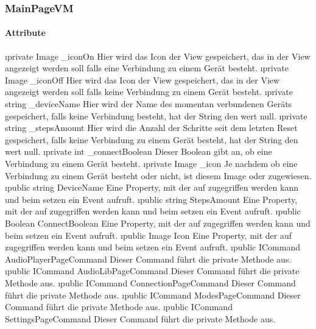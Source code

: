 \documentclass[../entwurf.tex]{subfiles}
\begin{document}
\subsubsection{MainPageVM}
\paragraph{Attribute}
\begin{itemize}
	\i{private Image \_iconOn} Hier wird das Icon der View gespeichert, das in der View angezeigt werden soll falls eine Verbindung zu einem Gerät besteht.
	\i{private Image \_iconOff} Hier wird das Icon der View gespeichert, das in der View angezeigt werden soll falls keine Verbindung zu einem Gerät besteht.
	\i{private string \_deviceName} Hier wird der Name des momentan verbundenen Geräts gespeichert, falls keine Verbindung besteht, hat der String den wert null.
	\i{private string \_stepsAmount} Hier wird die Anzahl der Schritte seit dem letzten Reset gespeichert, falls keine Verbindung zu einem Gerät besteht, hat der String den wert null.
	\i{private int \_connectBoolean} Dieser Boolean gibt an, ob eine Verbindung zu einem Gerät besteht.
	\i{private Image \_icon} Je nachdem ob eine Verbindung zu einem Gerät besteht oder nicht, ist diesem Image  oder  zugewiesen.
	\i{public string DeviceName} Eine Property, mit der auf  zugegriffen werden kann und beim setzen ein Event aufruft.
	\i{public string StepsAmount} Eine Property, mit der auf  zugegriffen werden kann und beim setzen ein Event aufruft.
	\i{public Boolean ConnectBoolean} Eine Property, mit der auf  zugegriffen werden kann und beim setzen ein Event aufruft.
	\i{public Image Icon} Eine Property, mit der auf  zugegriffen werden kann und beim setzen ein Event aufruft.
	\i{public ICommand AudioPlayerPageCommand} Dieser Command führt die private Methode  aus.
	\i{public ICommand AudioLibPageCommand} Dieser Command führt die private Methode  aus.
	\i{public ICommand ConnectionPageCommand} Dieser Command führt die private Methode  aus.
	\i{public ICommand ModesPageCommand} Dieser Command führt die private Methode  aus.
	\i{public ICommand SettingsPageCommand} Dieser Command führt die private Methode  aus.
\end{itemize}
\end{document}
